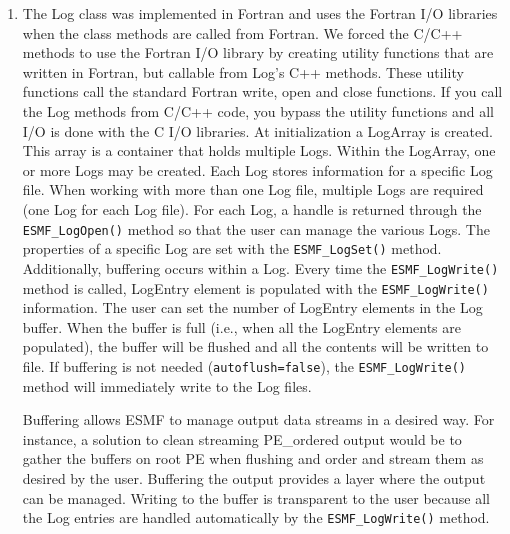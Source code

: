 %
\begin{enumerate}
\item The Log class was implemented in Fortran and uses the Fortran I/O 
libraries when the class methods are called from Fortran. We forced the C/C++
methods to use the Fortran I/O library by creating utility functions that are
written in Fortran, but callable from Log's C++ methods.  These utility 
functions call the standard Fortran write, open and close functions.  If you
call the Log methods from C/C++ code, you bypass the utility functions and 
all I/O is done with the C I/O libraries.
At initialization a LogArray is created.  This array is a container that holds
multiple Logs.  Within the LogArray, one or more Logs may be created.  Each Log
stores information for a specific Log file.   When working with more than one 
Log file, multiple Logs are required (one Log for each Log file).  For each 
Log, a handle is returned through the {\tt ESMF\_LogOpen()} method so that the
user can manage the various Logs.  The properties of a specific Log are set 
with the {\tt ESMF\_LogSet()} method.  Additionally, buffering occurs within a
Log.  Every time the {\tt ESMF\_LogWrite()} method is called, LogEntry element
is populated with the {\tt ESMF\_LogWrite()} information.  The user can set the
number of LogEntry elements in the Log buffer.  When the buffer is full (i.e.,
when all the LogEntry elements are populated), the buffer will be flushed and
all the contents will be written to file.  If buffering is not needed 
({\tt autoflush=false}), the {\tt ESMF\_LogWrite()} method will immediately 
write to the Log files. 

Buffering allows ESMF to manage output data streams in a desired way.  For 
instance, a solution to clean streaming PE\_ordered output would be to gather
the buffers on root PE when flushing and order and stream them as desired by
the user.  Buffering the output provides a layer where the output can be
managed.  Writing to the buffer is transparent to the user because all the Log
entries are handled automatically by the {\tt ESMF\_LogWrite()} method. 
\end{enumerate}




